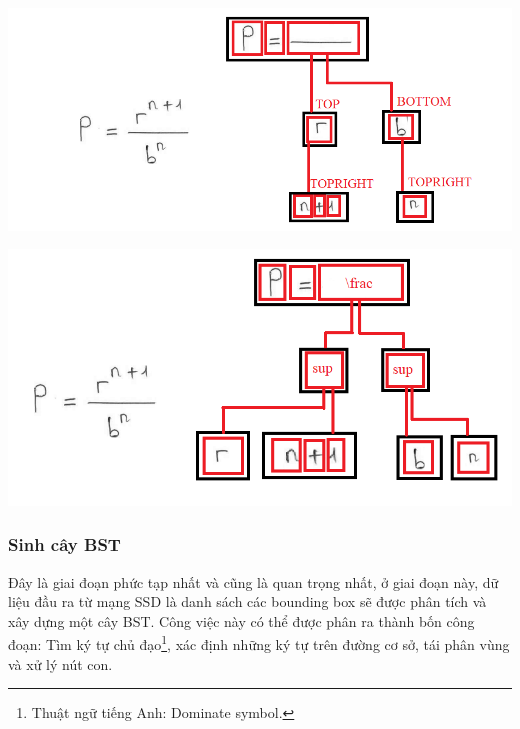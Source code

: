 \documentclass[a4paper]{article}
\theoremstyle{definition}
\begin{document}
	\begin{center}
		\centering
		\includegraphics[width=0.95\linewidth]{BST.png}
		\vspace{0.5cm}
	\end{center}	
	
	\begin{center}
		\centering
		\includegraphics[width=0.85\linewidth]{lexBST.png}
		\vspace{0.5cm}
	\end{center}
	
	
	
	\subsubsection{Sinh cây BST\cite{zanibbi}}
	
	Đây là giai đoạn phức tạp nhất và cũng là quan trọng nhất, ở giai đoạn này, dữ liệu đầu ra từ mạng SSD\cite{liu2016ssd} là danh sách các bounding box sẽ được phân tích và xây dựng một cây BST\cite{zanibbi}. Công việc này có thể được phân ra thành bốn công đoạn: Tìm ký tự chủ đạo\cite{zanibbi}\footnote{Thuật ngữ tiếng Anh: Dominate symbol.}, xác định những ký tự trên đường cơ sở, tái phân vùng và xử lý nút con.\\
	
\end{document}
